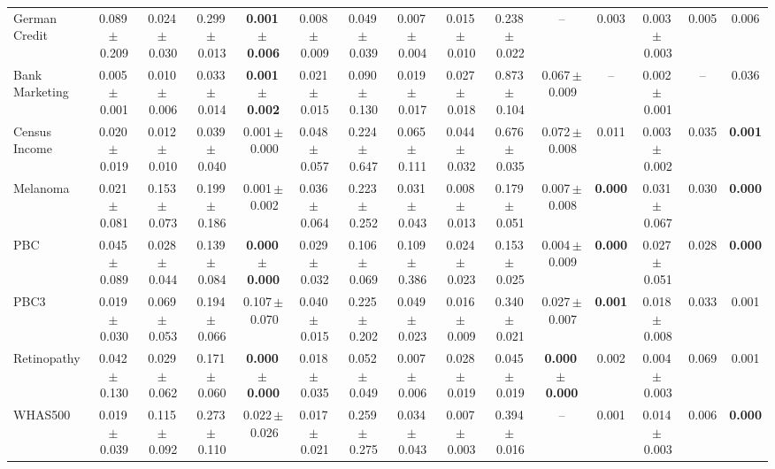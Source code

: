 \documentclass[8pt]{extarticle}
\begin{document}
\begin{longtable}{l*{14}{c}}
German Credit & 0.089\,$\pm$\,0.209 & 0.024\,$\pm$\,0.030 & 0.299\,$\pm$\,0.013 & \textbf{0.001\,$\pm$\,0.006} & 0.008\,$\pm$\,0.009 & 0.049\,$\pm$\,0.039 & 0.007\,$\pm$\,0.004 & 0.015\,$\pm$\,0.010 & 0.238\,$\pm$\,0.022 & -- & 0.003 & 0.003\,$\pm$\,0.003 & 0.005 & 0.006 \\
Bank Marketing & 0.005\,$\pm$\,0.001 & 0.010\,$\pm$\,0.006 & 0.033\,$\pm$\,0.014 & \textbf{0.001\,$\pm$\,0.002} & 0.021\,$\pm$\,0.015 & 0.090\,$\pm$\,0.130 & 0.019\,$\pm$\,0.017 & 0.027\,$\pm$\,0.018 & 0.873\,$\pm$\,0.104 & 0.067\,$\pm$\,0.009 & -- & 0.002\,$\pm$\,0.001 & -- & 0.036 \\
Census Income & 0.020\,$\pm$\,0.019 & 0.012\,$\pm$\,0.010 & 0.039\,$\pm$\,0.040 & 0.001\,$\pm$\,0.000 & 0.048\,$\pm$\,0.057 & 0.224\,$\pm$\,0.647 & 0.065\,$\pm$\,0.111 & 0.044\,$\pm$\,0.032 & 0.676\,$\pm$\,0.035 & 0.072\,$\pm$\,0.008 & 0.011 & 0.003\,$\pm$\,0.002 & 0.035 & \textbf{0.001} \\
Melanoma & 0.021\,$\pm$\,0.081 & 0.153\,$\pm$\,0.073 & 0.199\,$\pm$\,0.186 & 0.001\,$\pm$\,0.002 & 0.036\,$\pm$\,0.064 & 0.223\,$\pm$\,0.252 & 0.031\,$\pm$\,0.043 & 0.008\,$\pm$\,0.013 & 0.179\,$\pm$\,0.051 & 0.007\,$\pm$\,0.008 & \textbf{0.000} & 0.031\,$\pm$\,0.067 & 0.030 & \textbf{0.000} \\
PBC & 0.045\,$\pm$\,0.089 & 0.028\,$\pm$\,0.044 & 0.139\,$\pm$\,0.084 & \textbf{0.000\,$\pm$\,0.000} & 0.029\,$\pm$\,0.032 & 0.106\,$\pm$\,0.069 & 0.109\,$\pm$\,0.386 & 0.024\,$\pm$\,0.023 & 0.153\,$\pm$\,0.025 & 0.004\,$\pm$\,0.009 & \textbf{0.000} & 0.027\,$\pm$\,0.051 & 0.028 & \textbf{0.000} \\
PBC3 & 0.019\,$\pm$\,0.030 & 0.069\,$\pm$\,0.053 & 0.194\,$\pm$\,0.066 & 0.107\,$\pm$\,0.070 & 0.040\,$\pm$\,0.015 & 0.225\,$\pm$\,0.202 & 0.049\,$\pm$\,0.023 & 0.016\,$\pm$\,0.009 & 0.340\,$\pm$\,0.021 & 0.027\,$\pm$\,0.007 & \textbf{0.001} & 0.018\,$\pm$\,0.008 & 0.033 & 0.001 \\
Retinopathy & 0.042\,$\pm$\,0.130 & 0.029\,$\pm$\,0.062 & 0.171\,$\pm$\,0.060 & \textbf{0.000\,$\pm$\,0.000} & 0.018\,$\pm$\,0.035 & 0.052\,$\pm$\,0.049 & 0.007\,$\pm$\,0.006 & 0.028\,$\pm$\,0.019 & 0.045\,$\pm$\,0.019 & \textbf{0.000\,$\pm$\,0.000} & 0.002 & 0.004\,$\pm$\,0.003 & 0.069 & 0.001 \\
WHAS500 & 0.019\,$\pm$\,0.039 & 0.115\,$\pm$\,0.092 & 0.273\,$\pm$\,0.110 & 0.022\,$\pm$\,0.026 & 0.017\,$\pm$\,0.021 & 0.259\,$\pm$\,0.275 & 0.034\,$\pm$\,0.043 & 0.007\,$\pm$\,0.003 & 0.394\,$\pm$\,0.016 & -- & 0.001 & 0.014\,$\pm$\,0.003 & 0.006 & \textbf{0.000} \\

\end{longtable}
\end{document}
